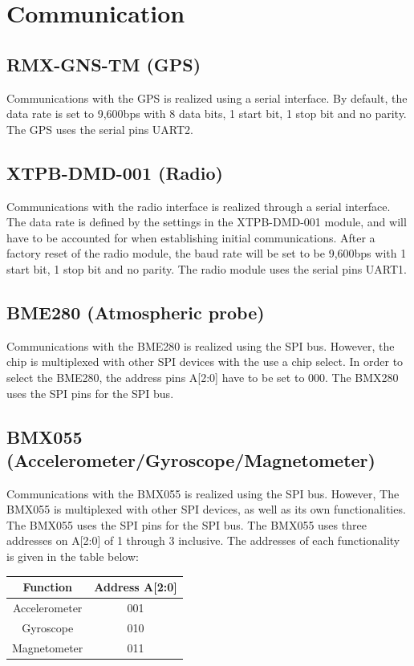 \documentclass[12pt,article]{memoir}
\begin{document}
\newpage

\chapter{Communication}
\label{chap:Communication}

\section{RMX-GNS-TM (GPS)}
Communications with the GPS is realized using a serial interface. By default, the data rate is set to 9,600bps with 8 data bits, 1 start bit, 1 stop bit and no parity. The GPS uses the serial pins UART2.

\section{XTPB-DMD-001 (Radio)}
Communications with the radio interface is realized through a serial interface. The data rate is defined by the settings in the XTPB-DMD-001 module, and will have to be accounted for when establishing initial communications. After a factory reset of the radio module, the baud rate will be set to be 9,600bps with 1 start bit, 1 stop bit and no parity. The radio module uses the serial pins UART1.

\section{BME280 (Atmospheric probe)}
Communications with the BME280 is realized using the SPI bus. However, the chip is multiplexed with other SPI devices with the use a chip select. In order to select the BME280, the address pins A[2:0] have to be set to 000. The BMX280 uses the SPI pins for the SPI bus.

\section{BMX055 (Accelerometer/Gyroscope/Magnetometer)}
Communications with the BMX055 is realized using the SPI bus. However, The BMX055 is multiplexed with other SPI devices, as well as its own functionalities. The BMX055 uses the SPI pins for the SPI bus. The BMX055 uses three addresses on A[2:0] of 1 through 3 inclusive. The addresses of each functionality is given in the table below:
\begin{table}[h]
\centering
\begin{tabular}{|c|c|}
	\hline
	Function & Address A[2:0]\\ \hline
	Accelerometer & 001\\ \hline
	Gyroscope & 010\\ \hline
	Magnetometer & 011\\ \hline
\end{tabular}
\end{table}
\end{document}
